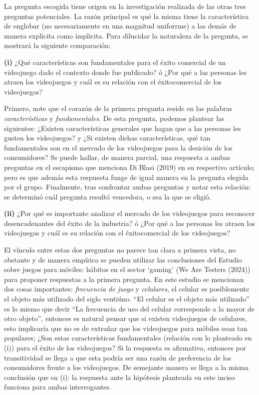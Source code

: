 \documentclass[
  letterpaper,
  DIV=11,
  numbers=noendperiod]{scrreprt}
\begin{document}
La pregunta escogida tiene origen en la investigación realizada de las
otras tres preguntas potenciales. La razón principal es qué la misma
tiene la característica de englobar (no necesariamente en una magnitud
uniforrme) a las demás de manera explícita como ímplicita. Para
dilucidar la naturaleza de la pregunta, se mostrará la siguiente
comparación:

\textbf{(i)} ¿Qué características son fundamentales para el éxito
comercial de un videojuego dado el contexto donde fue publicado? ó ¿Por
qué a las personas les atraen los videojuegos y cuál es su relación con
el éxitocomercial de los videojuegos?

Primero, note que el corazón de la primera pregunta reside en las
palabras \emph{características} y \emph{fundamentales}. De esta
pregunta, podemos plantear las siguientes: ¿Existen características
generales que hagan que a las personas les gusten los videojuegos? y ¿Si
existen dichas características, qué tan fundamentales son en el mercado
de los videojuegos para la desición de los consumidores? Se puede
hallar, de manera parcial, una respuesta a ambas preguntas en el
escapismo que menciona Di Blasi (2019) en su respectivo artículo; pero
es que además esta respuesta funge de igual manera en la pregunta
elegida por el grupo. Finalmente, tras confrontar ambas preguntas y
notar esta relación: se determinó cuál pregunta resultó vencedora, o sea
la que se eligió.

\textbf{(ii)} ¿Por qué es importante analizar el mercado de los
videojuegos para reconocer desencadenantes del éxito de la industria? ó
¿Por qué a las personas les atraen los videojuegos y cuál es su relación
con el éxitocomercial de los videojuegos?

El vínculo entre estas dos preguntas no parece tan clara a primera
vista, no obstante y de manera empírica se pueden utilizar las
conclusiones del Estudio sobre juegos para móviles: hábitos en el sector
`gaming' (We Are Testers (2024)) para proponer respuestas a la primera
pregunta. En este estudio se mencionan dos cosas importantes:
\emph{frecuencia de juego} y \emph{celulares}, el celular es
posiblemente el objeto más utilizado del siglo ventiúno. ``El celular es
el objeto más utilizado'' es lo mismo que decir ``La frecuencia de uso
del celular corresponde a la mayor de otro objeto'', entonces es natural
pensar que si existen videojuegos de celulares, esto implicaría que no
es de extrañar que los videojuegos para móbiles sean tan populares; ¿Son
estas características fundamentales (relación con lo planteado en (i))
para el éxito de los videojuegos? Si la respuesta es afirmativa,
entonces por transitividad se llega a que esta podría ser una razón de
preferencia de los consumidores frente a los videojuegos. De semejante
manera se llega a la misma conclusión que en (i): la respuesta ante la
hipótesis planteada en este inciso funciona para ambas interrogantes.
\end{document}
